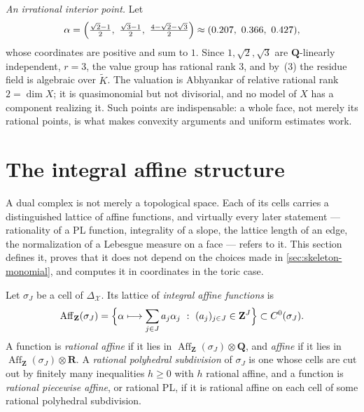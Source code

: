 \begin{example}
\emph{An irrational interior point.} Let
\[
 \alpha=\Bigl(\tfrac{\sqrt2-1}2,\ \tfrac{\sqrt3-1}2,\
   \tfrac{4-\sqrt2-\sqrt3}2\Bigr)
 \approx(0.207,\ 0.366,\ 0.427),
\]
whose coordinates are positive and sum to $1$. Since $1,\sqrt2,\sqrt3$
are $\mathbf Q$-linearly independent, $r=3$, the value group has
rational rank $3$, and by
\,(3) the residue field is algebraic
over $\widetilde K$. The valuation is Abhyankar of relative rational rank
$2=\dim X$; it is quasimonomial but not divisorial, and no model of $X$
has a component realizing it. Such points are indispensable: a whole face,
not merely its rational points, is what makes convexity arguments and
uniform estimates work.
\end{example}

\section{The integral affine structure}
\label{sec:skeleton-affine}

A dual complex is not merely a topological space. Each of its cells carries
a distinguished lattice of affine functions, and virtually every later
statement --- rationality of a PL function, integrality of a slope, the
lattice length of an edge, the normalization of a Lebesgue measure on a
face --- refers to it. This section defines it, proves that it does not
depend on the choices made in \cref{sec:skeleton-monomial}, and computes it
in coordinates in the toric case.

\begin{definition}
\label{def:integral-affine}
Let $\sigma_J$ be a cell of $\Delta_{\mathcal X}$. Its lattice of
\emph{integral affine functions} is
\[
 \operatorname{Aff}_{\mathbf Z}(\sigma_J)
 =\Bigl\{\alpha\longmapsto\sum_{j\in J}a_j\alpha_j\ :\
   (a_j)_{j\in J}\in\mathbf Z^{J}\Bigr\}
 \subset C^0(\sigma_J).
\]
A function is \emph{rational affine} if it lies in
$\operatorname{Aff}_{\mathbf Z}(\sigma_J)\otimes\mathbf Q$, and \emph{affine} if it lies
in $\operatorname{Aff}_{\mathbf Z}(\sigma_J)\otimes\mathbf R$. A \emph{rational
polyhedral subdivision} of $\sigma_J$ is one whose cells are cut out by
finitely many inequalities $h\ge0$ with $h$ rational affine, and a
function is \emph{rational piecewise affine}, or rational PL, if it is
rational affine on each cell of some rational polyhedral subdivision.
\end{definition}

